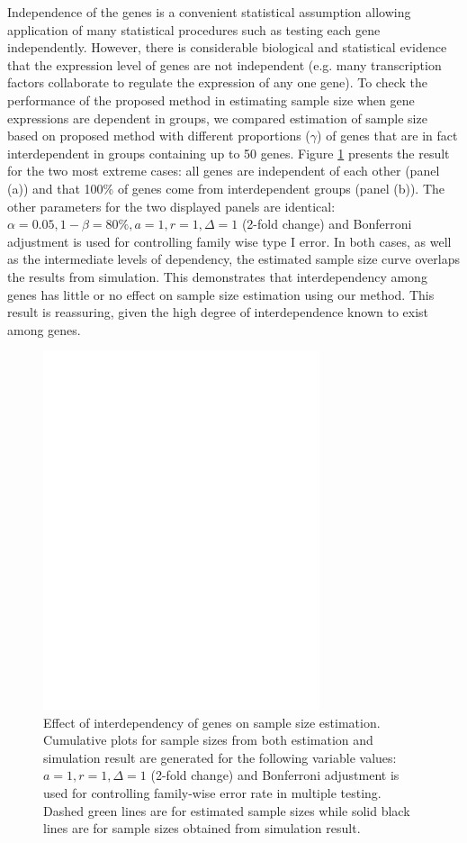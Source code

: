 \documentclass{bioinfo}
\begin{document}
Independence of the genes is a convenient statistical assumption
allowing application of many statistical procedures such as
testing each gene independently. However, there is considerable
biological and statistical evidence that the expression level of
genes are not independent (e.g. many transcription factors
collaborate to regulate the expression of any one gene). To check
the performance of the proposed method in estimating sample size
when gene expressions are dependent in groups, we compared
estimation of sample size based on proposed method with different
proportions ($\gamma$) of genes that are in fact interdependent in
groups containing up to 50 genes. Figure \ref{fig:ResDep} presents
the result for the two most extreme cases: all genes are
independent of each other (panel (a)) and that 100\% of genes come
from interdependent groups (panel (b)). The other parameters for
the two displayed panels are identical: $\alpha = 0.05, 1 - \beta
= 80\%, a = 1, r = 1, \Delta = 1$ (2-fold change) and Bonferroni
adjustment is used for controlling family wise type I error. In
both cases, as well as the intermediate levels of dependency, the
estimated sample size curve overlaps the results from simulation.
This demonstrates that interdependency among genes has little or
no effect on sample size estimation using our method. This result
is reassuring, given the high degree of interdependence known to
exist among genes.

\begin{figure}[h]
  \centerline{\includegraphics*[width=3.2in]{ResDepF.pdf}}
  \caption[Effect of interdependency of genes on sample size estimation]
  {Effect of interdependency of genes on sample size estimation.
    Cumulative plots for sample sizes from both estimation and simulation result
    are generated for the following variable values: $a = 1, r = 1, \Delta = 1$ (2-fold
    change) and Bonferroni adjustment is used for controlling family-wise error rate in multiple testing. Dashed green lines are for estimated sample sizes
    while solid black lines are for sample sizes obtained from simulation result.}
  \label{fig:ResDep}
\end{figure}
\end{document}

